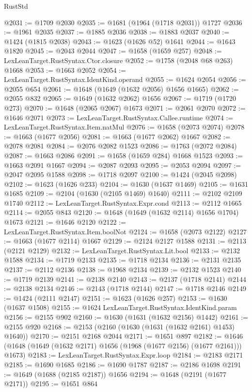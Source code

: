 \begin{lexlean}{RustStd}
\begin{coremodule}
{\begin{coremodule}
{{{{{{{{{{{{{{{{{{{{{{{{{{{{{{{{{{{{{{{{{{{{@2031 := @1709 @2030
@2035 := @1681 (@1964 (@1718 @2031)) @1727
@2036 := @1961 @2035
@2037 := @1885 @2036
@2038 := @1883 @2037
@2040 := @1424 (@1815 @2038)
@2043 := @1623 (@1626 @52) @1641
@2044 := @1643 @1820
@2045 := @2043 @2044
@2047 := @1658 (@1659 @257)
@2048 := LexLeanTarget.RustSyntax.Ctor.closure
@2052 := @1758 (@2048 @68 @263) @1668
@2053 := @1663 @2052
@2054 := LexLeanTarget.RustSyntax.IdentKind.operand
@2055 := @1624 @2054
@2056 := @2055 @654
@2061 := @1648 (@1649 (@1632 @2056) @1656 @1665)
@2062 := @2055 @832
@2065 := @1649 (@1632 @2062) @1656
@2067 := @1719 (@1720 @273)
@2070 := @1648 (@2065 @2067) @1673
@2071 := @2061 @2070
@2072 := @1646 @2071
@2073 := LexLeanTarget.RustSyntax.Callee.runtime
@2074 := LexLeanTarget.RustSyntax.Item.natMul
@2076 := @1658 (@2073 @2074)
@2078 := @1663 (@1677 @2056)
@2081 := @1663 (@1677 @2062) @1667
@2082 := @2078 @2081
@2084 := @2076 @2082 @1523
@2086 := @1763 (@2072 @2084)
@2087 := @1663 @2086
@2091 := @1658 (@1659 @284) @1668 @1523
@2093 := @1663 @2091 @1667
@2094 := @2087 @2093
@2095 := @2053 @2094
@2097 := @2047 @2095 @1588
@2098 := @1718 @2097
@2100 := @1424 (@2045 @2098)
@2102 := @1623 (@1626 @233)
@2104 := @1630 (@1637 @1469)
@2105 := @1631 @1685
@2109 := @2104 (@1630 (@2105 @1469) @1640)
@2111 := @2102 @2109 @1740
@2112 := LexLeanTarget.RustSyntax.Expr.cond
@2113 := @2112 @1665
@2114 := @2055 @843
@2120 := @1648 (@1649 (@1632 @2114) @1656 @1704) @1673
@2121 := @1646 @2120
@2122 := LexLeanTarget.RustSyntax.Item.boolNot
@2124 := @1658 (@2073 @2122)
@2127 := @1663 (@1677 @2114) @1667
@2129 := @2124 @2127 @1588
@2131 := @2113 (@2121 @2129)
@2132 := LexLeanTarget.RustSyntax.Lit.bool
@2133 := @2132 @1588
@2134 := @1719 @2133
@2135 := @1718 @2134
@2136 := @2131 @2135
@2137 := @2112 @2136
@2138 := @1968 @2134
@2139 := @2132 @1523
@2140 := @1719 @2139
@2141 := @2138 @2140
@2143 := @2137 (@1718 @2141)
@2144 := @2138 @2134
@2146 := @2143 (@1718 @2144)
@2147 := @1718 @2146
@2149 := @1424 (@2111 @2147)
@2151 := @1623 (@1626 @257)
@2153 := @1630 (@1637 @1508)
@2155 := @1624 LexLeanTarget.RustSyntax.IdentKind.param
@2156 := @2155 @902
@2160 := @1630 (@1631 (@1632 @2156) @1442)
@2161 := @2155 @920
@2168 := @2153 (@2160 (@1630 (@1631 (@1632 @2161) @1453) @1640))
@2170 := @2151 @2168 @2044
@2171 := @1651 @897
@2182 := @1646 (@1648 (@1649 (@1632 @2171) @1656 (@1968 (@1677 @2156) (@1677 @2161))) @1673)
@2183 := LexLeanTarget.RustSyntax.Expr.loop
@2184 := @2183 @2171
@2185 := @1690 @1685
@2186 := @1690 @1787
@2187 := @2186 @1698
@2191 := @1649 (@1688 (@2185 @2187)) @1656
@2194 := @1648 (@2191 (@1677 @2171))
@2195 := @1651 @864
}}}}}}}}}}}}}}}}}}}}}}}}}}}}}}}}}}}}}}}}}}}}
\end{coremodule}}
\end{coremodule}
\end{lexlean}

